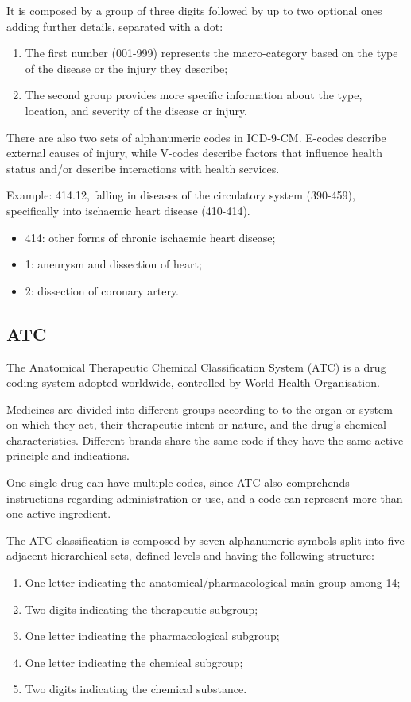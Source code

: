 It is composed by a group of three digits followed by up to two optional ones adding further details, separated with a dot:
\begin{enumerate}
	\item The first number (001-999) represents the macro-category based on the type of the disease or the injury they describe;
	\item The second group provides more specific information about the type, location, and severity of the disease or injury.
\end{enumerate}

There are also two sets of alphanumeric codes in ICD-9-CM. E-codes describe external causes of injury, while V-codes describe factors that influence health status and/or describe interactions with health services\cite{icd9en}.

Example: 414.12, falling in diseases of the circulatory system (390-459), specifically into ischaemic heart disease (410-414).
\begin{itemize}
	\item 414: other forms of chronic ischaemic heart disease;
		\item 1: aneurysm and dissection of heart;
			\item 2: dissection of coronary artery.
\end{itemize}

\subsection{ATC}
The Anatomical Therapeutic Chemical Classification System (ATC) is a drug coding system adopted worldwide, controlled by World Health Organisation.

Medicines are divided into different groups according to to the organ or system on which they act, their therapeutic intent or nature, and the drug's chemical characteristics. Different brands share the same code if they have the same active principle and indications.

One single drug can have multiple codes, since ATC also comprehends instructions regarding administration or use, and a code can represent more than one active ingredient.

The ATC classification is composed by seven alphanumeric symbols split into five adjacent hierarchical sets, defined levels and having the following structure\cite{atclevels}:
\begin{enumerate}
	\item One letter indicating the anatomical/pharmacological main group among 14;
	\item Two digits indicating the therapeutic subgroup;
	\item One letter indicating the pharmacological subgroup;
	\item One letter indicating the chemical subgroup;
	\item Two digits indicating the chemical substance.
\end{enumerate}

